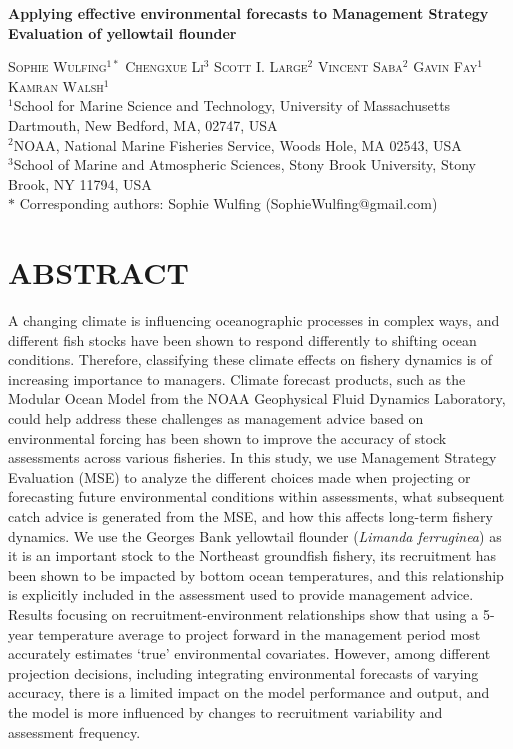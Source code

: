 \documentclass[
  12pt,
]{article}
\author{}
\date{\vspace{-2.5em}}
\begin{document}
\doublespacing

\begin{center}
    
\textbf{\Large Applying effective environmental forecasts to Management Strategy Evaluation of yellowtail flounder}
    
\textsc{Sophie Wulfing$^{1*}$ Chengxue Li$^{3}$ Scott I. Large$^{2}$ Vincent Saba$^{2}$ Gavin Fay$^{1}$ Kamran Walsh$^{1}$\\}
\vspace{3 mm}
\normalsize{\indent $^1$School for Marine Science and Technology, University of Massachusetts Dartmouth, New Bedford, MA, 02747, USA\\ $^2$NOAA, National Marine Fisheries Service, Woods Hole, MA 02543, USA\\ $^3$School of Marine and Atmospheric Sciences, Stony Brook University, Stony Brook, NY 11794, USA\\}
$\text{*}$ Corresponding authors: Sophie Wulfing (SophieWulfing@gmail.com)
\end{center}

\newpage

\linenumbers

\section{ABSTRACT}\label{abstract}

A changing climate is influencing oceanographic processes in complex ways, and different fish stocks have been shown to respond differently to shifting ocean conditions. Therefore, classifying these climate effects on fishery dynamics is of increasing importance to managers. Climate forecast products, such as the Modular Ocean Model from the NOAA Geophysical Fluid Dynamics Laboratory, could help address these challenges as management advice based on environmental forcing has been shown to improve the accuracy of stock assessments across various fisheries. In this study, we use Management Strategy Evaluation (MSE) to analyze the different choices made when projecting or forecasting future environmental conditions within assessments, what subsequent catch advice is generated from the MSE, and how this affects long-term fishery dynamics. We use the Georges Bank yellowtail flounder (\emph{Limanda ferruginea}) as it is an important stock to the Northeast groundfish fishery, its recruitment has been shown to be impacted by bottom ocean temperatures, and this relationship is explicitly included in the assessment used to provide management advice. Results focusing on recruitment-environment relationships show that using a 5-year temperature average to project forward in the management period most accurately estimates `true' environmental covariates. However, among different projection decisions, including integrating environmental forecasts of varying accuracy, there is a limited impact on the model performance and output, and the model is more influenced by changes to recruitment variability and assessment frequency.
\end{document}
